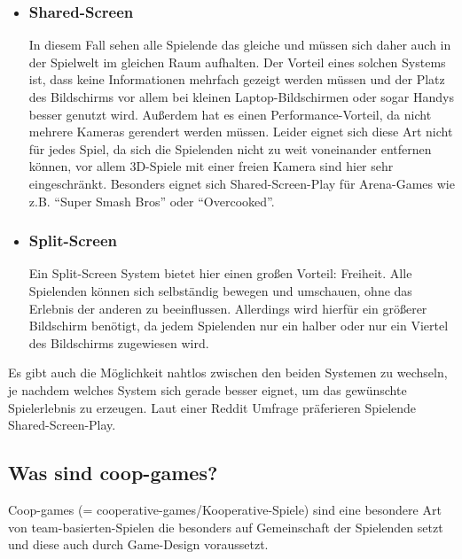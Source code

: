\begin{itemize}
	
\item \subsubsection{Shared-Screen}

In diesem Fall sehen alle Spielende das gleiche und müssen sich daher auch in der Spielwelt im gleichen Raum aufhalten. Der Vorteil eines solchen Systems ist, dass keine Informationen mehrfach gezeigt werden müssen und der Platz des Bildschirms vor allem bei kleinen Laptop-Bildschirmen oder sogar Handys besser genutzt wird. Außerdem hat es einen Performance-Vorteil, da nicht mehrere Kameras gerendert werden müssen. Leider eignet sich diese Art nicht für jedes Spiel, da sich die Spielenden nicht zu weit voneinander entfernen können, vor allem 3D-Spiele mit einer freien Kamera sind hier sehr eingeschränkt. Besonders eignet sich Shared-Screen-Play für Arena-Games wie z.B. "`Super Smash Bros"' oder "`Overcooked"'.

\item \subsubsection{Split-Screen}

Ein Split-Screen System bietet hier einen großen Vorteil: Freiheit. Alle Spielenden können sich selbständig bewegen und umschauen, ohne das Erlebnis der anderen zu beeinflussen. Allerdings wird hierfür ein größerer Bildschirm benötigt, da jedem Spielenden nur ein halber oder nur ein Viertel des Bildschirms zugewiesen wird.

\end{itemize}

\noindent Es gibt auch die Möglichkeit nahtlos zwischen den beiden Systemen zu wechseln, je nachdem welches System sich gerade besser eignet, um das gewünschte Spielerlebnis zu erzeugen. Laut einer Reddit Umfrage präferieren Spielende Shared-Screen-Play\cite{_shared_or_splitscreen_preference}.

\subsection{Was sind coop-games?}

Coop-games (= cooperative-games/Kooperative-Spiele) sind eine besondere Art von team-basierten-Spielen die besonders auf Gemeinschaft der Spielenden setzt und diese auch durch Game-Design voraussetzt. 

